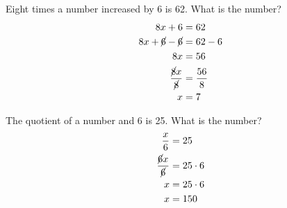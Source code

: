 \documentclass[11pt]{article} %
\begin{document}
Eight times a number increased by 6 is 62. What is the number? \\

\begin{align*}
8x + 6 &= 62 \\ 
8x + \cancel{6} - \cancel{6} &= 62 - 6 \\
8x &= 56 \\
\frac{\cancel{8}x}{\cancel{8}}&= \frac{56}{8} \\
x &= 7
\end{align*}

\noindent The quotient of a number and 6 is 25. What is the number?
\begin{align*}
\frac{x}{6} &= 25 \\
\frac{\cancel{6}x}{\cancel{6}} &= 25 \cdot 6 \\
x &= 25 \cdot 6 \\
x &= 150
\end{align*}
\end{document}
